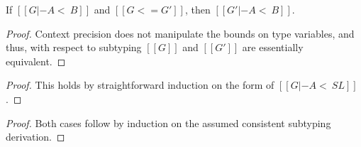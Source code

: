 \begin{lemma}
  \label{lemma:subtyping_context_precision}
  If $[[G |- A <~ B]]$ and $[[G <= G']]$, then $[[G' |- A <~ B]]$.
\end{lemma}
\begin{proof}
  Context precision does not manipulate the bounds on type variables, and thus,
  with respect to subtyping $[[G]]$ and $[[G']]$ are essentially equivalent.
\end{proof}

\begin{proof}
  This holds by straightforward induction on the form of $[[G |- A <~ SL]]$.
\end{proof}

\begin{proof}
  Both cases follow by induction on the assumed consistent subtyping
  derivation.
\end{proof}
